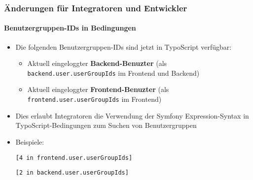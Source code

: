 %

\begin{frame}[fragile]
	\frametitle{Änderungen für Integratoren und Entwickler}
	\framesubtitle{Benutzergruppen-IDs in Bedingungen}


	\begin{itemize}
		\item Die folgenden Benutzergruppen-IDs sind jetzt in TypoScript verfügbar:

		\begin{itemize}
			\item Aktuell eingeloggter \textbf{Backend-Benuzter}\newline
				(als \texttt{backend.user.userGroupIds} im Frontend und Backend)
			\item Aktuell eingeloggter \textbf{Frontend-Benuzter}\newline
				(als \texttt{frontend.user.userGroupIds} im Frontend)
		\end{itemize}

		\item Dies erlaubt Integratoren die Verwendung der Symfony Expression-Syntax in
			TypoScript-Bedingungen zum Suchen von Benutzergruppen
		\item Beispiele:
\begin{lstlisting}
[4 in frontend.user.userGroupIds]
\end{lstlisting}
\vspace{-0.2cm}
\begin{lstlisting}
[2 in backend.user.userGroupIds]
\end{lstlisting}
	\end{itemize}

\end{frame}

